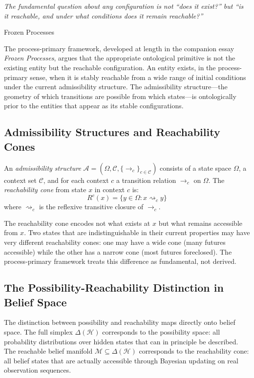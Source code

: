\documentclass[12pt, a4paper]{article}
\theoremstyle{plain}
\theoremstyle{definition}
\theoremstyle{remark}
\begin{document}
\epigraph{\textit{The fundamental question about any configuration is not
``does it exist?'' but ``is it reachable, and under what conditions
does it remain reachable?''}}{Frozen Processes}

\noindent
The process-primary framework, developed at length in the companion essay
\emph{Frozen Processes}, argues that the appropriate ontological primitive
is not the existing entity but the reachable configuration. An entity
exists, in the process-primary sense, when it is stably reachable from a
wide range of initial conditions under the current admissibility structure.
The admissibility structure---the geometry of which transitions are
possible from which states---is ontologically prior to the entities that
appear as its stable configurations.

\subsection{Admissibility Structures and Reachability Cones}

An \emph{admissibility structure} $\mathcal{A} = (\Omega, \mathcal{C},
\{\to_c\}_{c \in \mathcal{C}})$ consists of a state space $\Omega$,
a context set $\mathcal{C}$, and for each context $c$ a transition
relation $\to_c$ on $\Omega$. The \emph{reachability cone} from state
$x$ in context $c$ is:
$$R^c(x) = \{y \in \Omega : x \rightsquigarrow_c y\}$$
where $\rightsquigarrow_c$ is the reflexive transitive closure of $\to_c$.

The reachability cone encodes not what exists at $x$ but what remains
accessible from $x$. Two states that are indistinguishable in their
current properties may have very different reachability cones:
one may have a wide cone (many futures accessible) while the other
has a narrow cone (most futures foreclosed). The process-primary
framework treats this difference as fundamental, not derived.

\subsection{The Possibility-Reachability Distinction in Belief Space}

The distinction between possibility and reachability maps directly
onto belief space. The full simplex $\Delta(\mathcal{H})$ corresponds
to the possibility space: all probability distributions over hidden
states that can in principle be described. The reachable belief manifold
$\mathcal{M} \subseteq \Delta(\mathcal{H})$ corresponds to the
reachability cone: all belief states that are actually accessible
through Bayesian updating on real observation sequences.
\end{document}
